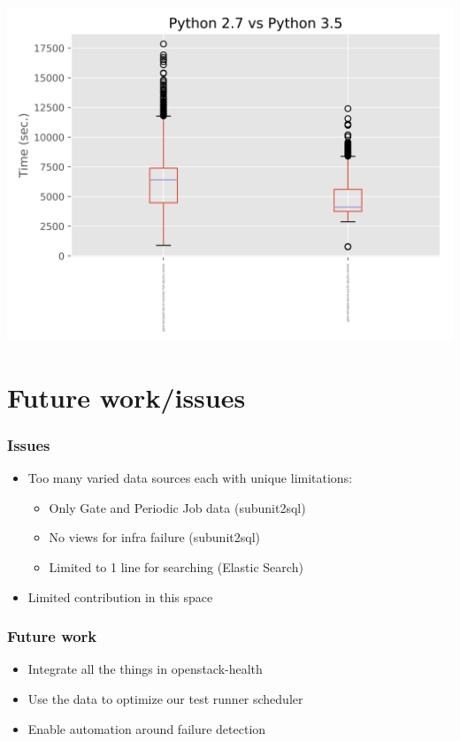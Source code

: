 \documentclass[aspectratio=169,11pt,hyperref={colorlinks=true}]{beamer}
\begin{document}
\begin{frame}
    \centering
    \includegraphics[width=\textwidth]{py2_v_py3.png}
\end{frame}

\section{Future work/issues}

\begin{frame}
    \frametitle{Issues}
    \begin{itemize}
        \item Too many varied data sources each with unique limitations:
        \begin{itemize}
            \item Only Gate and Periodic Job data (subunit2sql)
            \item No views for infra failure (subunit2sql)
            \item Limited to 1 line for searching (Elastic Search)
        \end{itemize}
        \item Limited contribution in this space
    \end{itemize}
\end{frame}

\begin{frame}
    \frametitle{Future work}
    \begin{itemize}
        \item Integrate all the things in openstack-health
        \item Use the data to optimize our test runner scheduler
        \item Enable automation around failure detection
    \end{itemize}
\end{frame}
\end{document}
